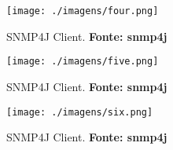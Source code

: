 \begin{figure}[h!]
  \centerline{\texttt{[image: ./imagens/four.png]}}
  \caption[Exemplo de criação de um projeto Web no Eclipse]
          {SNMP4J Client. \textbf{Fonte: snmp4j}
          \cite{Diagrama_do_SMNP4J}}
\label{fig:exemplo1}
\end{figure}




\begin{figure}[h!]
  \centerline{\texttt{[image: ./imagens/five.png]}}
  \caption[Exemplo de criação de um projeto Web no Eclipse]
          {SNMP4J Client. \textbf{Fonte: snmp4j}
          \cite{Diagrama_do_SMNP4J}}
\label{fig:exemplo1}
\end{figure}



\begin{figure}[h!]
  \centerline{\texttt{[image: ./imagens/six.png]}}
  \caption[Exemplo de criação de um projeto Web no Eclipse]
          {SNMP4J Client. \textbf{Fonte: snmp4j}
          \cite{Diagrama_do_SMNP4J}}
\label{fig:exemplo1}
\end{figure}


